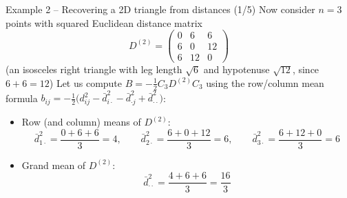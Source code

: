 \documentclass[aspectratio=169]{beamer}\usepackage[]{graphicx}\usepackage[]{xcolor}
\begin{document}
\begin{frame}{Example 2 -- Recovering a 2D triangle from distances (1/5)}
Now consider $n=3$ points with squared Euclidean distance matrix
\[
D^{(2)} = \begin{pmatrix}
0 & 6 & 6 \\
6 & 0 & 12 \\
6 & 12 & 0
\end{pmatrix}
\]
(an isosceles right triangle with leg length $\sqrt{6}$ and hypotenuse $\sqrt{12}$, since $6 + 6 = 12$)
\vfill
Let us compute $B = -\frac{1}{2}C_3 D^{(2)} C_3$ using the row/column mean formula $b_{ij} = -\frac{1}{2}\big(d_{ij}^2 - \bar{d}_{i\cdot}^2 - \bar{d}_{\cdot j}^2 + \bar{d}_{\cdot\cdot}^2\big)$:
\begin{itemize}
\item Row (and column) means of $D^{(2)}$:
\[
\bar{d}_{1\cdot}^2 = \frac{0+6+6}{3} = 4, \qquad
\bar{d}_{2\cdot}^2 = \frac{6+0+12}{3} = 6, \qquad
\bar{d}_{3\cdot}^2 = \frac{6+12+0}{3} = 6
\]
\item Grand mean of $D^{(2)}$:
\[
\bar{d}_{\cdot\cdot}^2 = \frac{4 + 6 + 6}{3} = \frac{16}{3}
\]
\end{itemize}
\end{frame}
\end{document}
